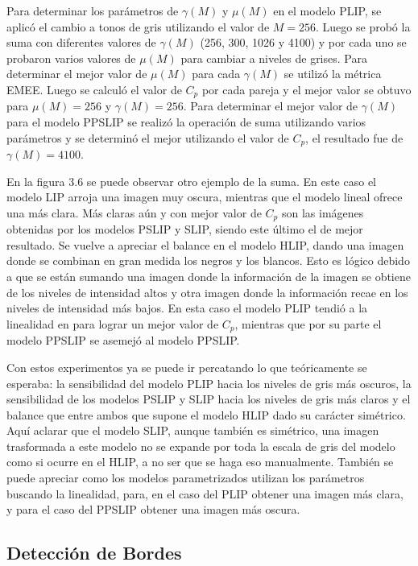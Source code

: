 Para determinar los par\'ametros de $\gamma(M)$ y $\mu(M)$ en el modelo PLIP, se aplic\'o el cambio a tonos de gris utilizando el valor de $M=256$. Luego se prob\'o la suma con diferentes valores de $\gamma(M)$ (256, 300, 1026 y 4100) y por cada uno se probaron varios valores de $\mu(M)$ para cambiar a niveles de grises. Para determinar el mejor valor de $\mu(M)$ para cada $\gamma(M)$ se utiliz\'o la m\'etrica EMEE. Luego se calcul\'o el valor de $C_p$ por cada pareja y el mejor valor se obtuvo para $\mu(M)=256$ y $\gamma(M)=256$. Para determinar el mejor valor de $\gamma(M)$ para el modelo PPSLIP se realiz\'o la operaci\'on de suma utilizando varios par\'ametros y se determin\'o el mejor utilizando el valor de $C_p$, el resultado fue de $\gamma(M)=4100$. 

En la figura 3.6 se puede observar otro ejemplo de la suma. En este caso el modelo LIP arroja una imagen muy oscura, mientras que el modelo lineal ofrece una m\'as clara. M\'as claras a\'un y con mejor valor de $C_p$ son las im\'agenes obtenidas por los modelos PSLIP y SLIP, siendo este \'ultimo el de mejor resultado. Se vuelve a apreciar el balance en el modelo HLIP, dando una imagen donde se combinan en gran medida los negros y los blancos. Esto es l\'ogico debido a que se est\'an sumando una imagen donde la informaci\'on de la imagen se obtiene de los niveles de intensidad altos y otra imagen donde la informaci\'on recae en los niveles de intensidad m\'as bajos. En esta caso el modelo PLIP tendi\'o a la linealidad en para lograr un mejor valor de $C_p$, mientras que por su parte el modelo PPSLIP se asemej\'o al modelo PPSLIP.

Con estos experimentos ya se puede ir percatando lo que te\'oricamente se esperaba: la sensibilidad del modelo PLIP hacia los niveles de gris m\'as oscuros, la sensibilidad de los modelos PSLIP y SLIP hacia los niveles de gris m\'as claros y el balance que entre ambos que supone el modelo HLIP dado su car\'acter sim\'etrico. Aqu\'i aclarar que el modelo SLIP, aunque tambi\'en es sim\'etrico, una imagen trasformada a este modelo no se expande por toda la escala de gris del modelo como si ocurre en el HLIP, a no ser que se haga eso manualmente. Tambi\'en se puede apreciar como los modelos parametrizados utilizan los par\'ametros buscando la linealidad, para, en el caso del PLIP obtener una imagen m\'as clara, y para el caso del PPSLIP obtener una imagen m\'as oscura. 

\subsection{Detecci\'on de Bordes}

